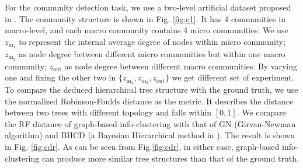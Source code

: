 \documentclass{article}
\begin{document}
For the community detection task, we use a two-level artificial dataset proposed in \cite{RN22}. 
The community structure is shown in Fig. \ref{fig:c1}. It has 4 communities in macro-level, and each macro community contains 4 micro communities. We use $z_{\mathrm{in}_1}$ to represent the internal average degree of nodes within micro community; $z_{\mathrm{in}_2}$ as node degree between different micro communities but within one macro community; $z_{\mathrm{out}}$ as node degree between different macro communities. By varying one and fixing the other two in $\{z_{\mathrm{in}_1}, z_{\mathrm{in}_2}, z_{\mathrm{out}} \}$ we get different set of experiment. To compare the deduced hierarchical tree structure with the ground truth, we use the normalized Robinson-Foulds distance as the metric. It describes the distance between two trees with different topology and falls within $[0,1]$. We compare the RF distance of graph-based info-clustering with that of GN (Girvan-Newman algorithm) and BHCD (a Bayesian Hierarchical method in \cite{RN23}). The result is shown in Fig. \ref{fig:cdr}. As can be seen from Fig.\ref{fig:cdr}, in either case, graph-based info-clustering can produce more similar tree structures than that of the ground truth.
\end{document}
